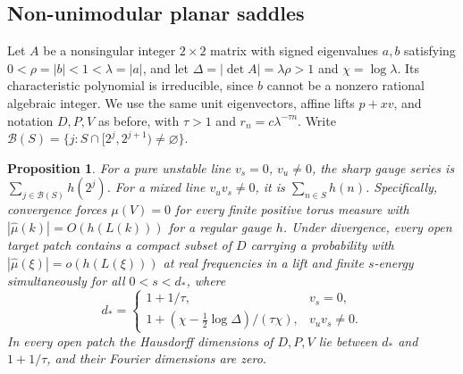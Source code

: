 \documentclass[11pt,a4paper,reqno]{amsart}
\newtheorem{proposition}[theorem]{Proposition}
\theoremstyle{definition}
\theoremstyle{remark}
\numberwithin{equation}{section}
\begin{document}
\subsection{Non-unimodular planar saddles}\label{sec:nonunit}

Let \(A\) be a nonsingular integer \(2\times2\) matrix with signed
eigenvalues \(a,b\) satisfying \(0<\rho=|b|<1<\lambda=|a|\), and let
\(\Delta=|\det A|=\lambda\rho>1\) and \(\chi=\log\lambda\).
Its characteristic polynomial is irreducible, since \(b\) cannot
be a nonzero rational algebraic integer. We use the same unit
eigenvectors, affine lifts \(p+xv\), and notation \(D,P,V\) as
before, with \(\tau>1\) and \(r_n=c\lambda^{-\tau n}\).
Write \(\mathcal B(S)=\{j:S\cap[2^j,2^{j+1})\ne\varnothing\}\).

\begin{proposition}\label{prop:nonunit-gauge}
For a pure unstable line \(v_s=0\), \(v_u\ne0\), the sharp gauge
series is \(\sum_{j\in\mathcal B(S)}h(2^j)\). For a mixed line
\(v_uv_s\ne0\), it is \(\sum_{n\in S}h(n)\). Specifically,
convergence forces \(\mu(V)=0\) for every finite positive torus
measure with \(|\widehat\mu(k)|=O(h(L(k)))\) for a regular gauge
\(h\). Under divergence, every open target patch contains a compact
subset of \(D\) carrying a probability with
\(|\widehat\mu(\xi)|=o(h(L(\xi)))\) at real frequencies in a lift
and finite \(s\)-energy simultaneously for all \(0<s<d_*\), where
\[
 d_*=
 \begin{cases}
 1+1/\tau,&v_s=0,\\[2pt]
 1+(\chi-\tfrac12\log\Delta)/(\tau\chi),&v_uv_s\ne0.
 \end{cases}
\]
In every open patch the Hausdorff dimensions of \(D,P,V\) lie
between \(d_*\) and \(1+1/\tau\), and their Fourier dimensions
are zero.
\end{proposition}
\end{document}
